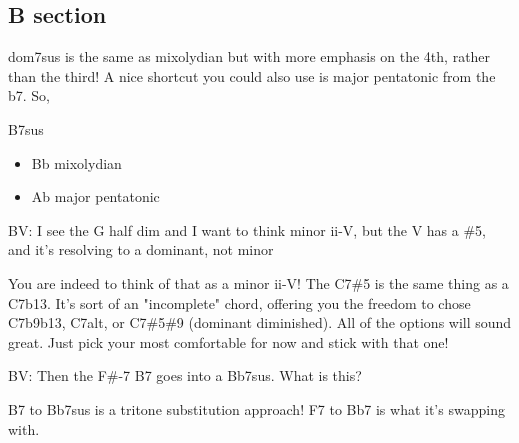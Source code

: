 \documentclass[11pt]{article}
\begin{document}
\subsection{B section}
\label{sec:org44afbcf}

dom7sus is the same as mixolydian but with more emphasis on the 4th, rather than the third! A nice shortcut you could also use is major pentatonic from the b7. So,

B\flat 7sus
\begin{itemize}
\item Bb mixolydian
\item Ab major pentatonic
\end{itemize}

BV: I see the G half dim and I want to think minor ii-V, but the V has a \#5, and it’s resolving to a dominant, not minor

You are indeed to think of that as a minor ii-V! The C7\#5 is the same thing as a C7b13. It's sort of an "incomplete" chord, offering you the freedom to chose C7b9b13, C7alt, or C7\#5\#9 (dominant diminished). All of the options will sound great. Just pick your most comfortable for now and stick with that one!

BV: Then the F\#-7 B7 goes into a Bb7sus. What is this?

B7 to Bb7sus is a tritone substitution approach! F7 to Bb7 is what it's swapping with.
\end{document}
